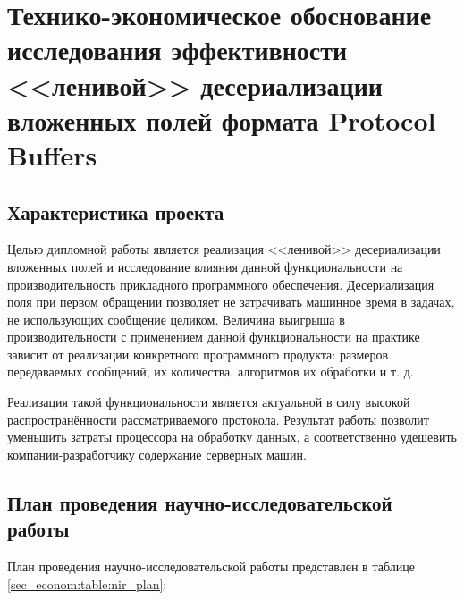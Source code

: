 \section{Технико-экономическое обоснование исследования эффективности <<ленивой>> десериализации вложенных полей формата Protocol Buffers}

\subsection{Характеристика проекта}

Целью дипломной работы является реализация <<ленивой>> десериализации вложенных полей и исследование влияния данной функциональности на производительность прикладного программного обеспечения.
Десериализация поля при первом обращении позволяет не затрачивать машинное время в задачах, не использующих сообщение целиком. 
Величина выигрыша в производительности с применением данной функциональности на практике зависит от реализации конкретного программного продукта: размеров передаваемых сообщений, их количества, алгоритмов их обработки и т. д.

Реализация такой функциональности является актуальной в силу высокой распространённости рассматриваемого протокола. Результат работы позволит уменьшить затраты процессора на обработку данных, а соответственно удешевить компании-разработчику содержание серверных машин.

\subsection{План проведения научно-исследовательской работы}

\newcommand{\teacher}{Научный руководитель}
\newcommand{\student}{Студент-дипломник}
\newcommand{\teoconsultant}{Консультант по ТЭО дипломной работы}

План проведения научно-исследовательской работы представлен в таблице \ref{sec_econom:table:nir_plan}:

